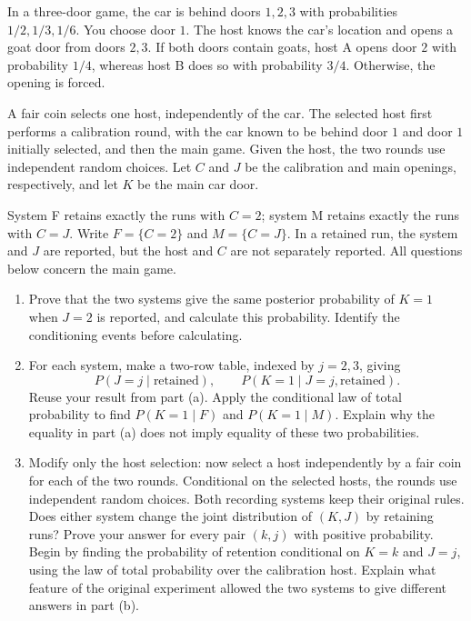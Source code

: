 \documentclass[11pt,a4paper]{article}
\newcommand{\Prob}{P}
\begin{document}
In a three-door game, the car is behind doors $1,2,3$ with probabilities
$1/2,1/3,1/6$. You choose door $1$. The host knows the car's location and
opens a goat door from doors $2,3$. If both doors contain goats, host A
opens door $2$ with probability $1/4$, whereas host B does so with
probability $3/4$. Otherwise, the opening is forced.

A fair coin selects one host, independently of the car. The selected host
first performs a calibration round, with the car known to be behind door
$1$ and door $1$ initially selected, and then the main game. Given the
host, the two rounds use independent random choices. Let $C$ and $J$
be the calibration and main openings, respectively, and let $K$ be the
main car door.

System F retains exactly the runs with $C=2$; system M retains exactly
the runs with $C=J$. Write $F=\{C=2\}$ and $M=\{C=J\}$. In a retained
run, the system and $J$ are reported, but the host and $C$ are not
separately reported. All questions below concern the main game.

\begin{enumerate}

\item Prove that the two systems give the same
posterior probability of $K=1$ when $J=2$ is reported, and calculate
this probability. Identify the conditioning events before calculating.

\item For each system, make a two-row table, indexed
by $j=2,3$, giving
\[
\Prob(J=j\mid\text{retained}),\qquad
\Prob(K=1\mid J=j,\text{retained}).
\]
Reuse your result from part (a). Apply the conditional law of total
probability to find \mbox{$\Prob(K=1\mid F)$} and
\mbox{$\Prob(K=1\mid M)$}.
Explain why the equality in part (a) does not imply equality of these
two probabilities.

\item Modify only the host selection: now select a
host independently by a fair coin for each of the two rounds.
Conditional on the selected hosts, the rounds use independent random
choices. Both recording systems keep their original rules. Does either
system change the joint distribution of $(K,J)$ by retaining runs?
Prove your answer for every pair $(k,j)$ with positive probability.
Begin by finding the probability of retention conditional on $K=k$
and $J=j$, using the law of total probability over the calibration
host. Explain what feature of the original experiment allowed the
two systems to give different answers in part (b).

\end{enumerate}
\end{document}
